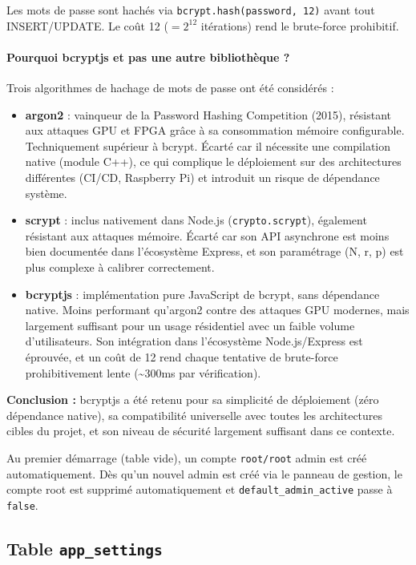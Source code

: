 \documentclass[12pt,a4paper]{article}
\begin{document}
Les mots de passe sont hachés via \texttt{bcrypt.hash(password, 12)} avant tout INSERT/UPDATE.
Le coût 12 ($= 2^{12}$ itérations) rend le brute-force prohibitif.

\paragraph{Pourquoi bcryptjs et pas une autre bibliothèque ?}

Trois algorithmes de hachage de mots de passe ont été considérés :

\begin{itemize}[label=\textbullet]
    \item \textbf{argon2} : vainqueur de la Password Hashing Competition (2015), résistant aux attaques GPU et FPGA grâce à sa consommation mémoire configurable. Techniquement supérieur à bcrypt. Écarté car il nécessite une compilation native (module C++), ce qui complique le déploiement sur des architectures différentes (CI/CD, Raspberry Pi) et introduit un risque de dépendance système.
    \item \textbf{scrypt} : inclus nativement dans Node.js (\texttt{crypto.scrypt}), également résistant aux attaques mémoire. Écarté car son API asynchrone est moins bien documentée dans l'écosystème Express, et son paramétrage (N, r, p) est plus complexe à calibrer correctement.
    \item \textbf{bcryptjs} : implémentation pure JavaScript de bcrypt, sans dépendance native. Moins performant qu'argon2 contre des attaques GPU modernes, mais largement suffisant pour un usage résidentiel avec un faible volume d'utilisateurs. Son intégration dans l'écosystème Node.js/Express est éprouvée, et un coût de 12 rend chaque tentative de brute-force prohibitivement lente (\textasciitilde 300ms par vérification).
\end{itemize}

\textbf{Conclusion :} bcryptjs a été retenu pour sa simplicité de déploiement (zéro dépendance native), sa compatibilité universelle avec toutes les architectures cibles du projet, et son niveau de sécurité largement suffisant dans ce contexte.

Au premier démarrage (table vide), un compte \texttt{root/root} admin est créé automatiquement.
Dès qu'un nouvel admin est créé via le panneau de gestion, le compte root est supprimé automatiquement
et \texttt{default\_admin\_active} passe à \texttt{false}.

\subsection{Table \texttt{app\_settings}}
\end{document}
